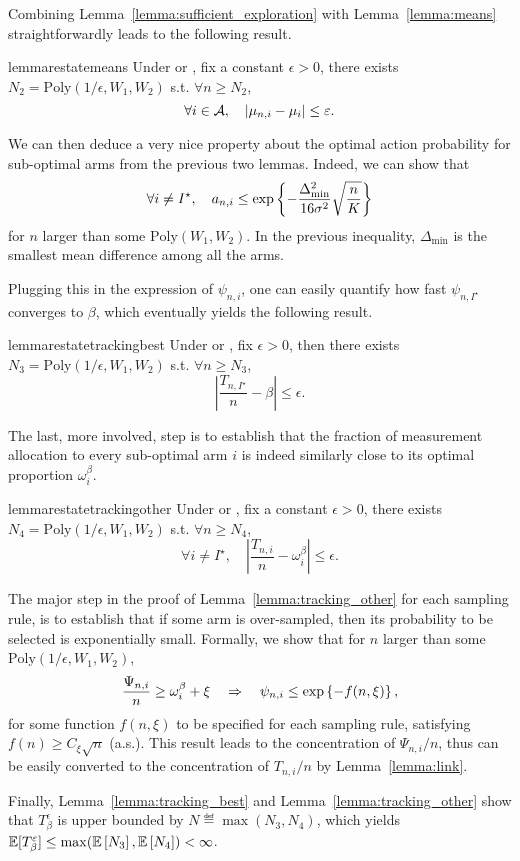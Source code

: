 Combining Lemma~\ref{lemma:sufficient_exploration} with Lemma~\ref{lemma:means} straightforwardly leads to the following result.

\begin{restatable}{lemma}{restatemeans}\label{lemma:tracking_means}
    Under \TTTS or \TCC, fix a constant $\epsilon > 0$, there exists $N_2 = \text{Poly}(1/\epsilon,W_1,W_2)$ s.t. $\forall n \geq N_2$,
    \[
        \forall i \in \mathcal{A}, \quad |\mu_{n,i}-\mu_i| \leq \varepsilon.
    \]
\end{restatable}

We can then deduce a very nice property about the optimal action probability for sub-optimal arms from the previous two lemmas. Indeed, we can show that
\[
    \forall i\neq I^\star, \quad a_{n,i} \leq \exp\left\{-\frac{\Delta_{\text{min}}^2}{16\sigma^2}\sqrt{\frac{n}{K}}\right\}
\]
for $n$ larger than some $\text{Poly}(W_1,W_2)$. In the previous inequality, $\Delta_{\text{min}}$ is the smallest mean difference among all the arms.

Plugging this in the expression of $\psi_{n,i}$, one can easily quantify how fast $\psi_{n,I^\star}$ converges to $\beta$, which eventually yields the following result. 

\begin{restatable}{lemma}{restatetrackingbest}\label{lemma:tracking_best}
    Under \TTTS or \TCC, fix $\epsilon > 0$, then there exists $N_3 = \text{Poly}(1/\epsilon,W_1,W_2)$ s.t. $\forall n \geq N_3$,
    \[
        \left|\frac{T_{n,I^\star}}{n} - \beta\right| \leq \epsilon. 
    \]
\end{restatable}

The last, more involved, step is to establish that the fraction of measurement allocation to every sub-optimal arm $i$ is indeed similarly close to its optimal proportion $\omega_i^\beta$.

\begin{restatable}{lemma}{restatetrackingother}\label{lemma:tracking_other}
    Under \TTTS or \TCC, fix a constant $\epsilon > 0$, there exists $N_4 = \text{Poly}(1/\epsilon,W_1,W_2)$ s.t. $\forall n \geq N_4$,
    \[
        \forall i\neq I^\star, \quad \left|\frac{T_{n,i}}{n} - \omega_i^\beta\right| \leq \epsilon. 
    \]
\end{restatable}

The major step in the proof of Lemma~\ref{lemma:tracking_other} for each sampling rule, is to establish that if some arm is over-sampled, then its probability to be selected is exponentially small. Formally, we show that for $n$ larger than some $\text{Poly}(1/\epsilon,W_1,W_2)$,
\[
    \frac{\Psi_{n,i}}{n} \geq \omega_{i}^\beta + \xi \ \ \ \Rightarrow \ \ \ \psi_{n,i} \leq \exp\left\{- f(n,\xi)\right\},
\]
for some function $f(n,\xi)$ to be specified for each sampling rule, satisfying $f(n)\geq C_\xi\sqrt{n}$ (a.s.). This result leads to the concentration of $\Psi_{n,i}/n$, thus can be easily converted to the concentration of $T_{n,i}/n$ by Lemma~\ref{lemma:link}.


Finally, Lemma~\ref{lemma:tracking_best} and Lemma~\ref{lemma:tracking_other} show that $T_\beta^\epsilon$ is upper bounded by $N \eqdef \max(N_3,N_4)$, which yields $\mathbb{E}[{T_\beta^\varepsilon}] \leq \max(\mathbb{E}\left[N_3\right],\mathbb{E}\left[N_4\right]) < \infty$.
